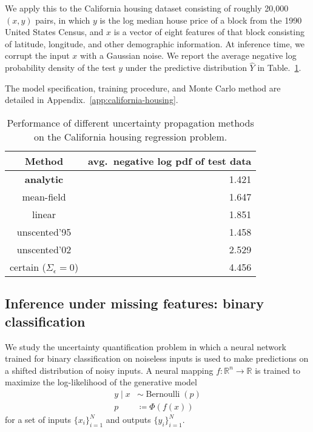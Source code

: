 \documentclass{article}
\begin{document}
We apply this to the California housing dataset consisting of roughly 20,000 \((x,y)\) pairs, in which \(y\) is the log median house price of a block from the 1990 United States Census, and \(x\) is a vector of eight features of that block consisting of latitude, longitude, and other demographic information.
At inference time, we corrupt the input \(x\) with a Gaussian noise.
We report the average negative log probability density of the test \(y\) under the predictive distribution \(\hat Y\) in Table.~\ref{tab:california-housing}.

The model specification, training procedure, and Monte Carlo method are detailed in Appendix.~\ref{app:california-housing}.

\begin{table}
  \begin{center}
    \begin{tabular}{cr}
      \toprule
      Method & avg.~negative log pdf of test data \\
      \midrule
      {\bfseries analytic} & 1.421 \\
      mean-field & 1.647 \\
      linear & 1.851 \\      
      unscented'95 & 1.458 \\
      unscented'02 & 2.529 \\
      certain (\(\Sigma_\epsilon = 0\)) & 4.456 \\
      \bottomrule
    \end{tabular}
  \end{center}
  \caption{\label{tab:california-housing} Performance of different uncertainty propagation methods on the California housing regression problem.}
\end{table}

\subsection{Inference under missing features: binary classification}
\label{sec:classification}
We study the uncertainty quantification problem in which a neural network trained for binary classification on noiseless inputs is used to make predictions on a shifted distribution of noisy inputs.
A neural mapping \(f: \mathbb R ^{n} \to \mathbb R\) is trained to maximize the log-likelihood of the generative model
\begin{align}
\label{eq:classification-model}
  y \mid x &\sim \operatorname{Bernoulli}(p)
  \\
  p &\coloneqq \Phi(f(x))
\end{align}
for a set of inputs \(\{x_i\}_{i=1}^N\) and outputs \(\{y_i\}_{i=1}^N\).
\end{document}

